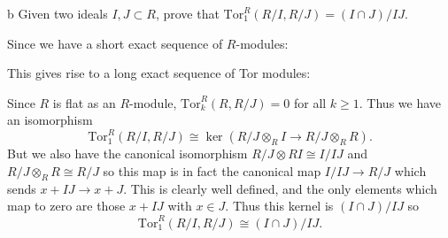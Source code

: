 \documentclass[11pt,letterpaper]{article}
\providecommand{\Tor}{\text{Tor}}
\begin{document}
\begin{solution}
    \begin{partproblem}{b}
        Given two ideals $I, J\subset R$, prove that $\mathrm{Tor}^R_1(R /I, R/J) = (I \cap J) / IJ$. 
    \end{partproblem}
    \quad Since we have a short exact sequence of $R$-modules:
    \begin{center}
    \end{center}
    This gives rise to a long exact sequence of Tor modules:
    \begin{center}
    \end{center}
    \quad Since $R$ is flat as an $R$-module, $\Tor_k^R(R, R/J)=0$ for all $k\geq 1$. Thus we have an isomorphism
    \[
        \Tor^R_1(R/I, R /J) \cong \ker(R /J\otimes_R I \to R /J\otimes_R R)
    .\] 
    But we also have the canonical isomorphism $R /J\otimes R I \cong I / IJ$ and $R /J\otimes_R R\cong R /J$ so this map is in fact the canonical map $I / IJ \to R /J$ which sends $x + IJ \to x + J$. This is clearly well defined, and the only elements which map to zero are those $x + IJ$ with $x\in J$. Thus this kernel is $(I\cap J) / IJ$ so
    \[
        \Tor^R_1(R/I, R /J) \cong (I \cap J) / IJ
    .\] 


\end{solution}
\end{document}
